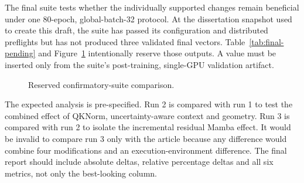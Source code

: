 The final suite tests whether the individually supported changes remain beneficial under one 80-epoch, global-batch-32 protocol. At the dissertation snapshot used to create this draft, the suite has passed its configuration and distributed preflights but has not produced three validated final vectors. Table~\ref{tab:final-pending} and Figure~\ref{fig:final-pending} intentionally reserve those outputs. A value must be inserted only from the suite's post-training, single-GPU validation artifact.

\begin{table}[htbp]
\centering
\caption{Final three-run confirmatory comparison. Pending cells must be populated from validated artifacts.}
\label{tab:final-pending}
\end{table}

\begin{figure}[htbp]
\centering
{}
\caption{Reserved confirmatory-suite comparison.}
\label{fig:final-pending}
\end{figure}

The expected analysis is pre-specified. Run 2 is compared with run 1 to test the combined effect of QKNorm, uncertainty-aware context and geometry. Run 3 is compared with run 2 to isolate the incremental residual Mamba effect. It would be invalid to compare run 3 only with the article because any difference would combine four modifications and an execution-environment difference. The final report should include absolute deltas, relative percentage deltas and all six metrics, not only the best-looking column.

